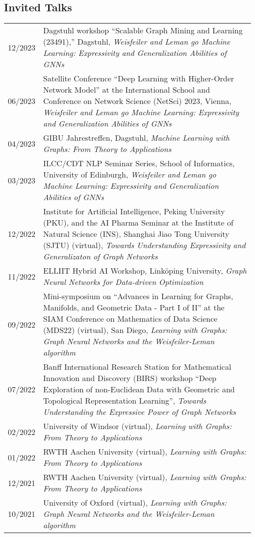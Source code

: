 \documentclass[11pt, a4paper, DIV=12]{scrartcl}
\begin{document}
\subsection*{Invited Talks}
\begin{tabular}{p{2.1cm}p{12.0cm}}
12/2023& Dagstuhl workshop ``Scalable Graph Mining and Learning (23491),'' Dagstuhl, \emph{Weisfeiler and Leman go Machine Learning: Expressivity and Generalization Abilities of GNNs}\\
06/2023& Satellite Conference ``Deep Learning with Higher-Order Network Model'' at the International School
and Conference on Network Science (NetSci) 2023, Vienna, \emph{Weisfeiler and Leman go Machine Learning: Expressivity and Generalization Abilities of GNNs}\\
04/2023& GIBU Jahrestreffen, Dagstuhl, \emph{Machine Learning with Graphs: From Theory to Applications}\\
03/2023& ILCC/CDT NLP Seminar Series, School of Informatics, University of Edinburgh, \emph{Weisfeiler and Leman go Machine Learning: Expressivity and Generalization Abilities of GNNs}\\
12/2022& Institute for Artificial Intelligence, Peking University (PKU), and the AI Pharma Seminar at the Institute of Natural Science (INS), Shanghai Jiao Tong University (SJTU) (virtual), \emph{Towards Understanding Expressivity and Generalizaton of Graph Networks}\\
11/2022& ELLIIT Hybrid AI Workshop, Linköping University, \emph{Graph Neural Networks for Data-driven Optimization}\\
09/2022& Mini-symposium on ``Advances in Learning for Graphs, Manifolds, and Geometric Data - Part I of II'' at the SIAM Conference on Mathematics of Data Science (MDS22) (virtual), San Diego, \emph{Learning with Graphs: Graph Neural Networks and the Weisfeiler-Leman algorithm}\\	
07/2022& Banff International Research Station for Mathematical Innovation and Discovery (BIRS) workshop ``Deep Exploration of non-Euclidean Data with Geometric and Topological Representation Learning'',  \emph{Towards Understanding the Expressive Power of Graph Networks}\\	
02/2022& University of Windsor (virtual), \emph{Learning with Graphs: From Theory to Applications}\\
01/2022&RWTH Aachen University (virtual), \emph{Learning with Graphs: From Theory to Applications}\\
12/2021&RWTH Aachen University (virtual), \emph{Learning with Graphs: From Theory to Applications}\\
10/2021&University of Oxford (virtual), \emph{Learning with Graphs: Graph Neural Networks and the Weisfeiler-Leman algorithm}\\

\end{tabular}
\end{document}
